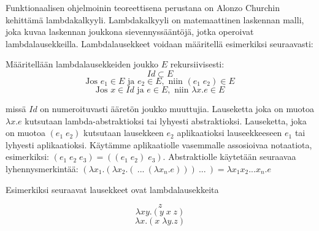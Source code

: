 Funktionaalisen ohjelmoinin teoreettisena perustana on Alonzo Churchin kehittämä lambdakalkyyli. Lambdakalkyyli on matemaattinen laskennan malli, joka kuvaa laskennan joukkona sievennyssääntöjä, jotka operoivat lambdalausekkeilla. Lambdalausekkeet voidaan määritellä esimerkiksi seuraavasti:


\begin{maar}[Lambdalausekkeet]
Määritellään lambdalausekkeiden joukko $E$ rekursiivisesti: 
\[ Id \subset E \]
\[ \text{Jos } e_{1} \in E \text{ ja } e_{2} \in E, \text{ niin }  (e_{1} \; e_{2}) \in E \]
\[ \text{Jos } x \in Id \text{ ja } e \in E, \text{ niin } \lambda x.e \in E \]

missä $Id$ on numeroituvasti ääretön joukko muuttujia. Lauseketta joka on muotoa $\lambda x.e$ kutsutaan lambda-abstraktioksi tai lyhyesti abstraktioksi. Lauseketta, joka on muotoa $(e_{1} \; e_{2})$ kutsutaan lausekkeen $e_{2}$ aplikaatioksi lauseekkeeseen $e_{1}$ tai lyhyesti aplikaatioksi. Käytämme aplikaatiolle vasemmalle assosioivaa notaatiota, esimerkiksi: 
$(e_{1} \; e_{2} \; e_{3}) = ((e_{1} \; e_{2}) \; e_{3})$. Abstraktiolle käytetään seuraavaa lyhennysmerkintää: 
$(\lambda x_{1} . ( \lambda x_{2} . ( \: ... \: ( \lambda x_{n} . e ))) \: ... \: ) = \lambda x_{1}x_{2}...x_{n}.e$
\end{maar}

\begin{esim}
Esimerkiksi seuraavat lausekkeet ovat lambdalausekkeita

\[ z \]
\[ \lambda xy . ( y \; x \; z ) \]
\[ \lambda x . ( x \; \lambda y . z ) \]
 
\end{esim}

